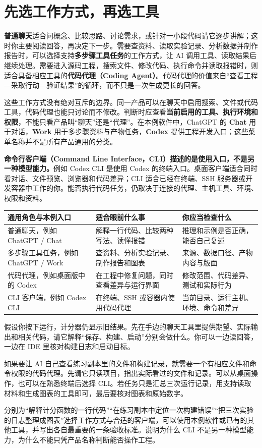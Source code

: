 \section{先选工作方式，再选工具}
\label{sec:ai-entry}

\textbf{普通聊天}适合问概念、比较思路、讨论需求，或针对一小段代码请它逐步讲解；这时你主要阅读回答，再决定下一步。需要查资料、读取实验记录、分析数据并制作报告时，可以选择支持\textbf{多步骤工具任务}的工作方式，让 AI 调用工具、读取结果后继续处理。需要进入源码工程，搜索文件、修改代码、执行命令并读取报错时，则适合具备相应工具的\textbf{代码代理（Coding Agent）}。代码代理的价值来自“查看工程—采取行动—验证结果”的循环，而不只是一次生成更长的回答。

这些工作方式没有绝对互斥的边界。同一产品可以在聊天中启用搜索、文件或代码工具，代码代理也能只讨论而不修改。判断时应查看\textbf{当前启用的工具、执行环境和权限}，不能只看产品叫“聊天”还是“代理”。在本例软件中，ChatGPT 的 \textbf{Chat} 用于对话，\textbf{Work} 用于多步骤资料与产物任务，\textbf{Codex} 提供工程开发入口；这些菜单名称并不是所有产品通用的分类。

\textbf{命令行客户端（Command Line Interface，CLI）描述的是使用入口，不是另一种模型能力。}例如 Codex CLI 是使用 Codex 的终端入口。桌面客户端适合同时看对话、文件预览、浏览器和代码差异；CLI 适合已经在终端、SSH 服务器或开发容器中工作的你。能否执行代码任务，仍取决于连接的代理、主机工具、环境、权限和资料。

\begin{center}
\begin{tabular}{p{}p{}p{}}
\toprule
通用角色与本例入口 & 适合眼前什么事 & 你应当检查什么 \\
\midrule
普通聊天，例如 ChatGPT / Chat & 解释一行代码、比较两种写法、读懂报错 & 推理和示例是否正确，能否自己复述 \\
多步骤工具任务，例如 ChatGPT / Work & 查资料、分析实验记录、制作报告和图表 & 来源、数据口径、产物内容与版面 \\
代码代理，例如桌面版中的 Codex & 在工程中修复问题，同时查看差异与运行界面 & 修改范围、代码差异、测试和实际行为 \\
CLI 客户端，例如 Codex CLI & 在终端、SSH 或容器内使用代码代理 & 当前目录、运行主机、环境、命令和差异 \\
\bottomrule
\end{tabular}
\end{center}

\begin{example}
假设你按下运行，计分器仍显示旧结果。先在手边的聊天工具里提供期望、实际输出和相关代码，请它解释“保存、构建、启动”分别会做什么。你可以一边读回答，一边在 IDE 里核对构建日志和启动目标。

如果要让 AI 自己查看练习副本里的文件和构建记录，就需要一个有相应文件和命令权限的代码代理。先请它只读项目，指出实际看过的文件和记录。可以从桌面操作，也可以在熟悉终端后选择 CLI。若任务只是汇总三次运行记录，用支持读取材料和生成图表的工具即可，最后要核对图表和原始数字。
\end{example}

\begin{exercise}\label{ex:ai-desktop-entry}
分别为“解释计分函数的一行代码”“在练习副本中定位一次构建错误”“把三次实验的日志整理成图表”选择工作方式与合适的客户端，可以使用本例软件或已有的其他工具，并写出各自最重要的一条验收标准。说明为什么 CLI 不是另一种模型能力，为什么不能只凭产品名称判断能否操作工程。
\end{exercise}
